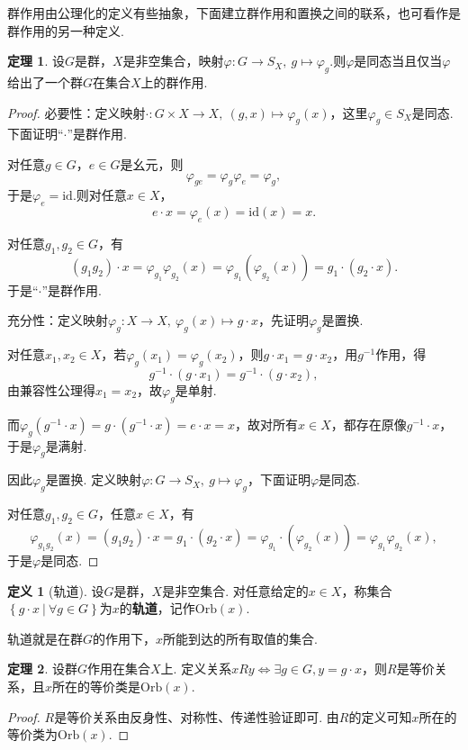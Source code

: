 \documentclass[12pt]{ctexart}
\theoremstyle{definition}
\newtheorem{definition}{定义}[section]
\newtheorem{theorem}{定理}[section]
\theoremstyle{plain}
\newcommand{\id}{\mathrm{id}}
\newcommand{\Orb}{\mathrm{Orb}}
\begin{document}
群作用由公理化的定义有些抽象，下面建立群作用和置换之间的联系，也可看作是群作用的另一种定义.
\begin{theorem}
	设$G$是群，$X$是非空集合，映射$\varphi:G\to S_X,\ g\mapsto\varphi_{g}$.则$\varphi$是同态当且仅当$\varphi$给出了一个群$G$在集合$X$上的群作用.
\end{theorem}
\begin{proof}
	必要性：定义映射$\cdot:G\times X\to X,\ (g,x)\mapsto\varphi_g(x)$，这里$\varphi_g\in S_X$是同态. 下面证明“$\cdot$”是群作用.
	
	对任意$g\in G$，$e\in G$是幺元，则
	$$\varphi_{ge}=\varphi_g\varphi_e=\varphi_g,$$
	于是$\varphi_e=\id$.则对任意$x\in X$，
	$$e\cdot x=\varphi_e(x)=\id(x)=x.$$
	
	对任意$g_1,g_2\in G$，有
	$$(g_1g_2)\cdot x=\varphi_{g_1}\varphi_{g_2}(x)=\varphi_{g_1}(\varphi_{g_2}(x))=g_1\cdot(g_2\cdot x).$$
	于是“$\cdot$”是群作用.
	
	充分性：定义映射$\varphi_g:X\to X,\ \varphi_g(x)\mapsto g\cdot x$，先证明$\varphi_g$是置换.
	
	对任意$x_1,x_2\in X$，若$\varphi_g(x_1)=\varphi_g(x_2)$，则$g\cdot x_1=g\cdot x_2$，用$g^{-1}$作用，得
	$$g^{-1}\cdot(g\cdot x_1)=g^{-1}\cdot(g\cdot x_2),$$由兼容性公理得$x_1=x_2$，故$\varphi_g$是单射.
	
	而$\varphi_{g}(g^{-1}\cdot x)=g\cdot(g^{-1}\cdot x)=e\cdot x=x$，故对所有$x\in X$，都存在原像$g^{-1}\cdot x$，于是$\varphi_g$是满射.
	
	因此$\varphi_g$是置换. 定义映射$\varphi:G\to S_X,\ g\mapsto\varphi_g$，下面证明$\varphi$是同态.
	
	对任意$g_1,g_2\in G$，任意$x\in X$，有
	$$\varphi_{g_1g_2}(x)=(g_1g_2)\cdot x=g_1\cdot(g_2\cdot x)=\varphi_{g_1}\cdot(\varphi_{g_2}(x))=\varphi_{g_1}\varphi_{g_2}(x),$$
	于是$\varphi$是同态.
\end{proof}
\begin{definition}[轨道]
	设$G$是群，$X$是非空集合. 对任意给定的$x\in X$，称集合$\left\{g\cdot x\ |\ \forall g\in G\right\}$为$x$的\textbf{轨道}，记作$\Orb(x)$.
\end{definition}
轨道就是在群$G$的作用下，$x$所能到达的所有取值的集合.
\begin{theorem}
	设群$G$作用在集合$X$上. 定义关系$xRy\iff \exists g\in G,y=g\cdot x$，则$R$是等价关系，且$x$所在的等价类是$\Orb(x)$.
\end{theorem}
\begin{proof}
	$R$是等价关系由反身性、对称性、传递性验证即可. 由$R$的定义可知$x$所在的等价类为$\Orb(x)$.
\end{proof}
\end{document}
